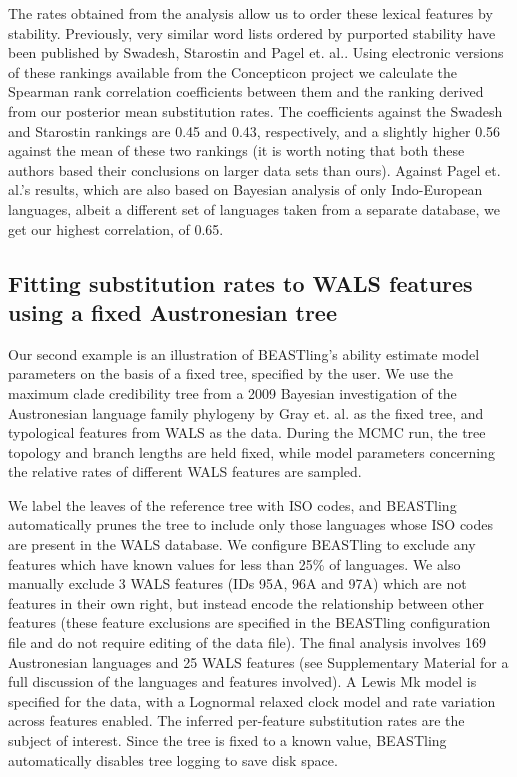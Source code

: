 \documentclass[twocolumn,10pt]{scrartcl}
\begin{document}
The rates obtained from the analysis allow us to order these lexical features by stability.
Previously, very similar word lists ordered by purported stability have been published by Swadesh\cite{Swadesh1955}, Starostin\cite{Starostin2007} and Pagel et. al.\cite{Pagel2007}.
Using electronic versions of these rankings available from the Concepticon project\cite{List2015} we calculate the Spearman rank correlation coefficients between them and the ranking derived from our posterior mean substitution rates. The coefficients against the Swadesh and Starostin rankings are 0.45 and 0.43, respectively, and a slightly higher 0.56 against the mean of these two rankings (it is worth noting that both these authors based their conclusions on larger data sets than ours).  Against Pagel et. al.'s results, which are also based on Bayesian analysis of only Indo-European languages, albeit a different set of languages taken from a separate database, we get our highest correlation, of 0.65.

\subsection{Fitting substitution rates to WALS features using a fixed Austronesian tree}

Our second example is an illustration of BEASTling's ability estimate model parameters on the basis of a fixed tree, specified by the user.  We use the maximum clade credibility tree from a 2009 Bayesian investigation of the Austronesian language family phylogeny by Gray et. al.\cite{Gray2009} as the fixed tree, and typological features from WALS \cite{Dryer2013} as the data.  During the MCMC run, the tree topology and branch lengths are held fixed, while model parameters concerning the relative rates of different WALS features are sampled.

We label the leaves of the reference tree with ISO codes, and BEASTling automatically prunes the tree to include only those languages whose ISO codes are present in the WALS database.  We configure BEASTling to exclude any features which have known values for less than 25\% of languages.  We also manually exclude 3 WALS features (IDs 95A, 96A and 97A) which are not features in their own right, but instead encode the relationship between other features (these feature exclusions are specified in the BEASTling configuration file and do not require editing of the data file).  The final analysis involves 169 Austronesian languages and 25 WALS features (see Supplementary Material for a full discussion of the languages and features involved).  A Lewis Mk model is specified for the data, with a Lognormal relaxed clock model and rate variation across features enabled.  The inferred per-feature substitution rates are the subject of interest.  Since the tree is fixed to a known value, BEASTling automatically disables tree logging to save disk space.
\end{document}
